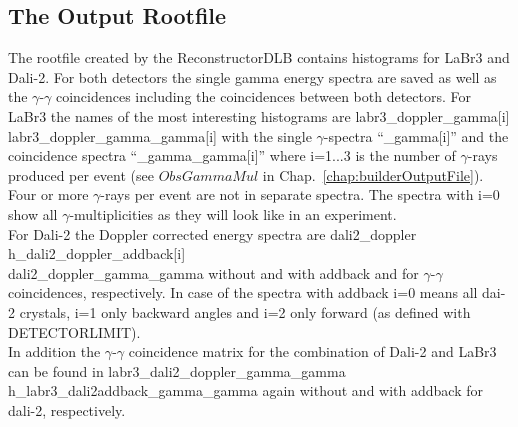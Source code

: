 \documentclass[12pt]{book}
\begin{document}
\subsection{The Output Rootfile}


The rootfile created by the ReconstructorDLB contains histograms for LaBr3 and Dali-2. For both detectors the single gamma energy spectra are saved as well as the $\gamma$-$\gamma$ coincidences including the coincidences between both detectors. For LaBr3 the names of the most interesting histograms are\hfill{}
\linebreak
{\ttfamily labr3\_doppler\_gamma[i]\\
labr3\_doppler\_gamma\_gamma[i]}
\linebreak
with the single $\gamma$-spectra ``\_gamma[i]'' and the coincidence spectra ``\_gamma\_gamma[i]'' where i=1...3 is the number of $\gamma$-rays produced per event (see $ObsGammaMul$ in Chap.~\ref{chap:builderOutputFile}). Four or more $\gamma$-rays per event are not in separate spectra. The spectra with i=0 show all $\gamma$-multiplicities as they will look like in an experiment.\\

For Dali-2 the Doppler corrected energy spectra are\hfill{}
\linebreak
{\ttfamily 
dali2\_doppler\\
h\_dali2\_doppler\_addback[i]\\
dali2\_doppler\_gamma\_gamma}
\linebreak
without and with addback and for $\gamma$-$\gamma$ coincidences, respectively. In case of the spectra with addback i=0 means all dai-2 crystals, i=1 only backward angles and i=2 only forward (as defined with DETECTORLIMIT).\\

In addition the $\gamma$-$\gamma$ coincidence matrix for the combination of Dali-2 and LaBr3 can be found in\hfill{}
\linebreak
{\ttfamily labr3\_dali2\_doppler\_gamma\_gamma\\
h\_labr3\_dali2addback\_gamma\_gamma}
\linebreak
again without and with addback for dali-2, respectively.\\
\end{document}
